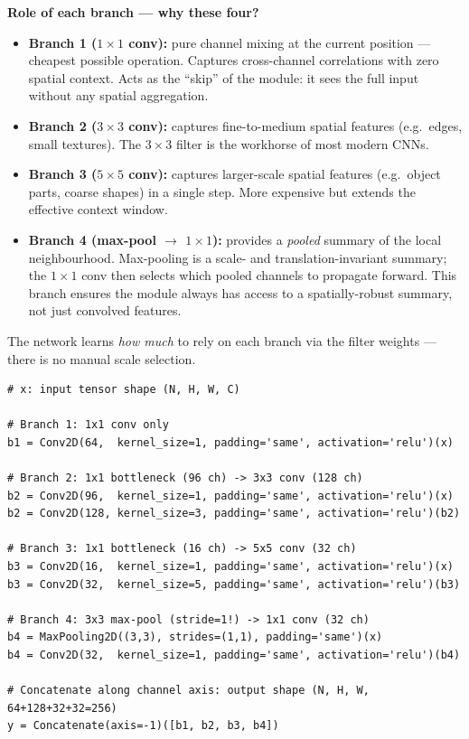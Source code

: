 \documentclass[11pt,a4paper]{article}
\begin{document}
\textbf{Role of each branch — why these four?}
\begin{itemize}
  \item \textbf{Branch 1 ($1\times1$ conv):} pure channel mixing at the current position —
    cheapest possible operation.  Captures cross-channel correlations with zero spatial context.
    Acts as the ``skip'' of the module: it sees the full input without any spatial aggregation.
  \item \textbf{Branch 2 ($3\times3$ conv):} captures fine-to-medium spatial features (e.g.\
    edges, small textures).  The $3\times3$ filter is the workhorse of most modern CNNs.
  \item \textbf{Branch 3 ($5\times5$ conv):} captures larger-scale spatial features (e.g.\
    object parts, coarse shapes) in a single step.  More expensive but extends the effective
    context window.
  \item \textbf{Branch 4 (max-pool $\to$ $1\times1$):} provides a \emph{pooled} summary of the
    local neighbourhood.  Max-pooling is a scale- and translation-invariant summary; the
    $1\times1$ conv then selects which pooled channels to propagate forward.  This branch ensures
    the module always has access to a spatially-robust summary, not just convolved features.
\end{itemize}
The network learns \emph{how much} to rely on each branch via the filter weights — there is no
manual scale selection.

\begin{lstlisting}[caption={Inception module in Keras (bottleneck version)}]
# x: input tensor shape (N, H, W, C)

# Branch 1: 1x1 conv only
b1 = Conv2D(64,  kernel_size=1, padding='same', activation='relu')(x)

# Branch 2: 1x1 bottleneck (96 ch) -> 3x3 conv (128 ch)
b2 = Conv2D(96,  kernel_size=1, padding='same', activation='relu')(x)
b2 = Conv2D(128, kernel_size=3, padding='same', activation='relu')(b2)

# Branch 3: 1x1 bottleneck (16 ch) -> 5x5 conv (32 ch)
b3 = Conv2D(16,  kernel_size=1, padding='same', activation='relu')(x)
b3 = Conv2D(32,  kernel_size=5, padding='same', activation='relu')(b3)

# Branch 4: 3x3 max-pool (stride=1!) -> 1x1 conv (32 ch)
b4 = MaxPooling2D((3,3), strides=(1,1), padding='same')(x)
b4 = Conv2D(32,  kernel_size=1, padding='same', activation='relu')(b4)

# Concatenate along channel axis: output shape (N, H, W, 64+128+32+32=256)
y = Concatenate(axis=-1)([b1, b2, b3, b4])
\end{lstlisting}
\end{document}
